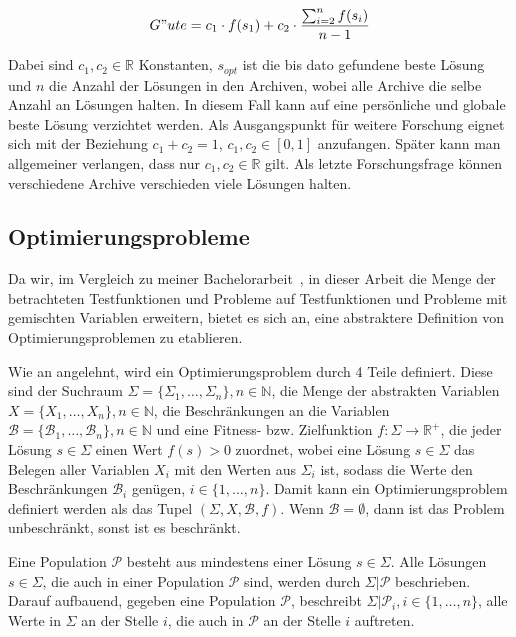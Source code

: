 \documentclass[fontsize=12, a4aper]{scrartcl}
\begin{document}
	\begin{equation} \label{eq:Archiveguete}
		G"ute = c_1 \cdot f(s_1) + c_2 \cdot \frac{\sum_{i = 2}^n f(s_i)}{n - 1}
	\end{equation}
	
	Dabei sind \(c_1, c_2 \in \mathbb{R}\) Konstanten, \(s_{opt}\) ist die bis dato gefundene beste Lösung und \(n\) die Anzahl der Lösungen in den Archiven, wobei alle Archive die selbe Anzahl an Lösungen halten. In diesem Fall kann auf eine persönliche und globale beste Lösung verzichtet werden. Als Ausgangspunkt für weitere Forschung eignet sich mit der Beziehung \(c_1 + c_2 = 1\), \(c_1, c_2 \in [0,1]\) anzufangen. Später kann man allgemeiner verlangen, dass nur \(c_1, c_2 \in \mathbb{R}\) gilt. Als letzte Forschungsfrage können verschiedene Archive verschieden viele Lösungen halten.
	
	\subsection{Optimierungsprobleme} \label{sec:Optimierungsprobleme}
	
	Da wir, im Vergleich zu meiner Bachelorarbeit~\cite{FCM_2019}, in dieser Arbeit die Menge der betrachteten Testfunktionen und Probleme auf Testfunktionen und Probleme mit gemischten Variablen erweitern, bietet es sich an, eine abstraktere Definition von Optimierungsproblemen zu etablieren.\hfill\newline
	
	Wie an \cite{lin2015simple} angelehnt, wird ein Optimierungsproblem durch 4 Teile definiert. Diese sind der Suchraum \(\Sigma = \{\Sigma_1, \dots, \Sigma_n\}, n \in \mathbb{N}\), die Menge der abstrakten Variablen \(X = \{X_1, \dots, X_n\}, n \in \mathbb{N}\), die Beschränkungen an die Variablen \(\mathcal{B} = \{\mathcal{B}_1, \dots, \mathcal{B}_n\}, n \in \mathbb{N}\) und eine Fitness- bzw. Zielfunktion \(f: \Sigma \to \mathbb{R}^+\), die jeder Lösung \(s \in \Sigma\) einen Wert \(f(s) > 0\) zuordnet, wobei eine Lösung \(s \in \Sigma\) das Belegen aller Variablen \(X_i\) mit den Werten aus \(\Sigma_i\) ist, sodass die Werte den Beschränkungen \(\mathcal{B}_i\) genügen, \(i \in \{1, \dots, n\}\). Damit kann ein Optimierungsproblem definiert werden als das Tupel \((\Sigma, X, \mathcal{B}, f)\). Wenn \(\mathcal{B} = \emptyset\), dann ist das Problem unbeschränkt, sonst ist es beschränkt.\hfill\newline
	
	Eine Population \(\mathcal{P}\) besteht aus mindestens einer Lösung \(s \in \Sigma\). Alle Lösungen \(s \in \Sigma\), die auch in einer Population \(\mathcal{P}\) sind, werden durch \(\Sigma|\mathcal{P}\) beschrieben. Darauf aufbauend, gegeben eine Population \(\mathcal{P}\), beschreibt \(\Sigma|\mathcal{P}_i, i \in \{1, \dots, n\}\), alle Werte in \(\Sigma\) an der Stelle \(i\), die auch in \(\mathcal{P}\) an der Stelle \(i\) auftreten.\hfill\newline
	
\end{document}
